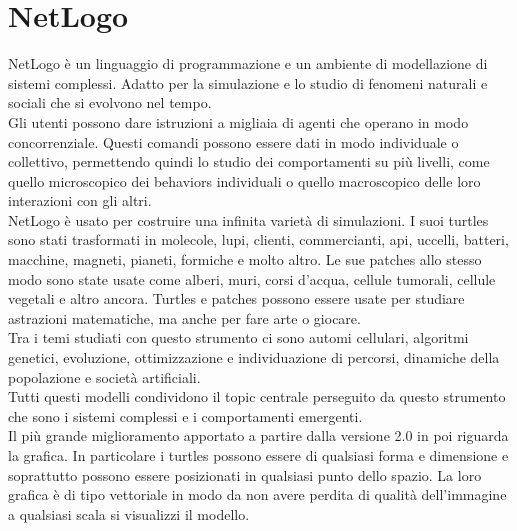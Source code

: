 \section {NetLogo} 
\label{sec:netlogo}
NetLogo \nocite{wilensky-tisue} \cite{netlogo} è un linguaggio di programmazione e un ambiente di modellazione di sistemi complessi. Adatto per la simulazione e lo studio di fenomeni naturali e sociali che si evolvono nel tempo.\\
Gli utenti possono dare istruzioni a migliaia di agenti che operano in modo concorrenziale. Questi comandi possono essere dati in modo individuale o collettivo, permettendo quindi lo studio dei comportamenti su più livelli, come quello microscopico dei behaviors individuali o quello macroscopico delle loro interazioni con gli altri.\\
NetLogo è usato per costruire una infinita varietà di simulazioni. I suoi turtles sono stati trasformati in molecole, lupi, clienti, commercianti, api, uccelli, batteri, macchine, magneti, pianeti, formiche e molto altro. Le sue patches allo stesso modo sono state usate come alberi, muri, corsi d'acqua, cellule tumorali, cellule vegetali e altro ancora. Turtles e patches possono essere usate per studiare astrazioni matematiche, ma anche per fare arte o giocare.\\
Tra i temi studiati con questo strumento ci sono automi cellulari, algoritmi genetici, evoluzione, ottimizzazione e individuazione di percorsi, dinamiche della popolazione e società artificiali.\\
Tutti questi modelli condividono il topic centrale perseguito da questo strumento che sono i sistemi complessi e i comportamenti emergenti.\\
Il più grande miglioramento apportato a partire dalla versione 2.0 in poi riguarda la grafica. In particolare i turtles possono essere di qualsiasi forma e dimensione e soprattutto possono essere posizionati in qualsiasi punto dello spazio. La loro grafica è di tipo vettoriale in modo da non avere perdita di qualità dell'immagine a qualsiasi scala si visualizzi il modello.\\

